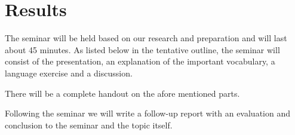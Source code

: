 \section*{Results}
The seminar will be held based on our research and preparation and will last about 45 minutes. As listed below in the tentative outline, the seminar will consist of the presentation, an explanation of the important vocabulary, a language exercise and a discussion.

There will be a complete handout on the afore mentioned parts.

Following the seminar we will write a follow-up report with an evaluation and conclusion to the seminar and the topic itself.
